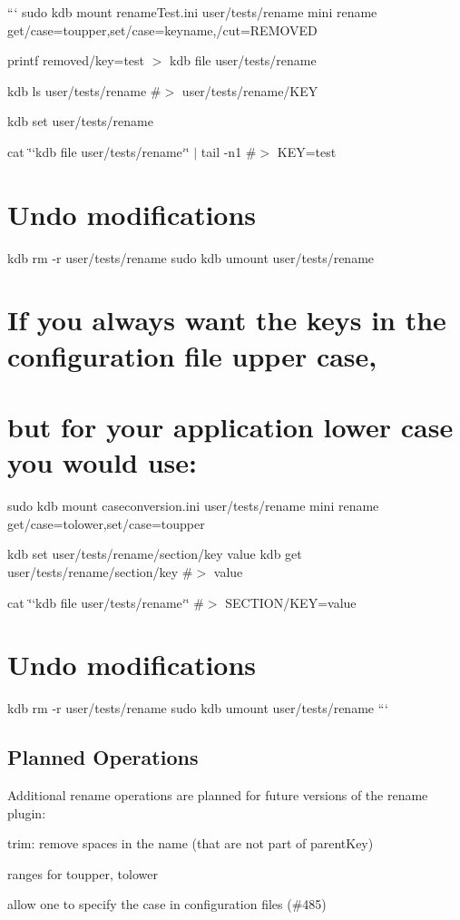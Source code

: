 ``` sudo kdb mount rename\+Test.\+ini user/tests/rename mini rename get/case=toupper,set/case=keyname,/cut=R\+E\+M\+O\+V\+ED

printf \textquotesingle{}removed/key=test\textquotesingle{} $>$ {\ttfamily kdb file user/tests/rename}

kdb ls user/tests/rename \#$>$ user/tests/rename/\+K\+EY

kdb set user/tests/rename

cat \char`\"{}`kdb file user/tests/rename`\char`\"{} $\vert$ tail -\/n1 \#$>$ K\+EY=test\hypertarget{autotoc_md603_autotoc_md614}{}\section{Undo modifications}\label{autotoc_md603_autotoc_md614}
kdb rm -\/r user/tests/rename sudo kdb umount user/tests/rename 
\begin{DoxyCode}
\end{DoxyCode}
 \hypertarget{autotoc_md603_autotoc_md615}{}\section{If you always want the keys in the configuration file upper case,}\label{autotoc_md603_autotoc_md615}
\hypertarget{autotoc_md603_autotoc_md616}{}\section{but for your application lower case you would use\+:}\label{autotoc_md603_autotoc_md616}
sudo kdb mount caseconversion.\+ini user/tests/rename mini rename get/case=tolower,set/case=toupper

kdb set user/tests/rename/section/key value kdb get user/tests/rename/section/key \#$>$ value

cat \char`\"{}`kdb file user/tests/rename`\char`\"{} \#$>$ S\+E\+C\+T\+I\+O\+N/\+K\+EY=value\hypertarget{autotoc_md603_autotoc_md617}{}\section{Undo modifications}\label{autotoc_md603_autotoc_md617}
kdb rm -\/r user/tests/rename sudo kdb umount user/tests/rename ```\hypertarget{autotoc_md603_autotoc_md618}{}\subsection{Planned Operations}\label{autotoc_md603_autotoc_md618}
Additional rename operations are planned for future versions of the rename plugin\+:


\begin{DoxyItemize}
\item trim\+: remove spaces in the name (that are not part of parent\+Key)
\item ranges for toupper, tolower
\item allow one to specify the case in configuration files (\#485) 
\end{DoxyItemize}